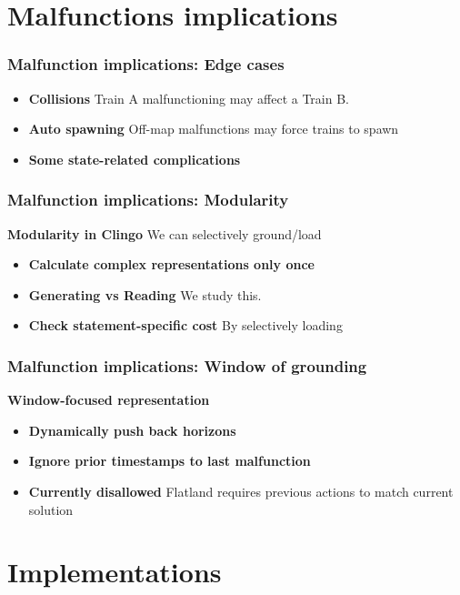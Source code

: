 \section{Malfunctions implications}

\begin{frame}
	\frametitle{Malfunction implications: Edge cases}
		\begin{itemize}
		\item \textbf{Collisions} Train A malfunctioning may affect a Train B.
		\item \textbf{Auto spawning}  Off-map malfunctions may force trains to spawn
		\item \textbf{Some state-related complications}  
	\end{itemize}
	
	
\end{frame}


\begin{frame}
	\frametitle{Malfunction implications: Modularity}
	\textbf{Modularity in Clingo} We can selectively ground/load
		\begin{itemize}
		\item \textbf{Calculate complex representations only once} 
		\item \textbf{Generating vs Reading} We study this.
		\item \textbf{Check statement-specific cost}  By selectively loading
	\end{itemize}
\end{frame}


\begin{frame}
	\frametitle{Malfunction implications: Window of grounding}
		\textbf{Window-focused representation} 
	\begin{itemize}
		\item \textbf{Dynamically push back horizons} 
		\item \textbf{Ignore prior timestamps to last malfunction} 
		\item \textbf{Currently disallowed} Flatland requires previous actions to match current solution
		
	\end{itemize}
\end{frame}

\section{Implementations}

